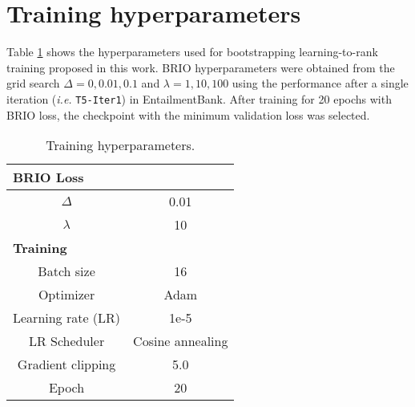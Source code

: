 \section{Training hyperparameters}
\label{sec:appendix-hyperparam}

Table \ref{tab:hyperparams} shows the hyperparameters used for bootstrapping learning-to-rank training proposed in this work. BRIO hyperparameters were obtained from the grid search $\Delta=0, 0.01, 0.1$ and $\lambda=1,10,100$ using the performance after a single iteration (\textit{i.e.} \texttt{T5-Iter1}) in EntailmentBank. After training for 20 epochs with BRIO loss, the checkpoint with the minimum validation loss was selected.

\begin{table}[h]
    \small
    \centering
    \begin{tabular}{c|c}
         \hline
         \multicolumn{2}{l}{\textbf{BRIO Loss}} \\
         \hline
         $\Delta$ & 0.01 \\
         $\lambda$ & 10 \\
         \hline
         \multicolumn{2}{l}{\textbf{Training}} \\
         \hline
         Batch size & 16 \\
         Optimizer & Adam \\
         Learning rate (LR) & 1e-5 \\
         LR Scheduler & Cosine annealing \\
         Gradient clipping & 5.0 \\
         Epoch & 20 \\
    \end{tabular}
    \caption{Training hyperparameters.}
\label{tab:hyperparams}
\end{table}